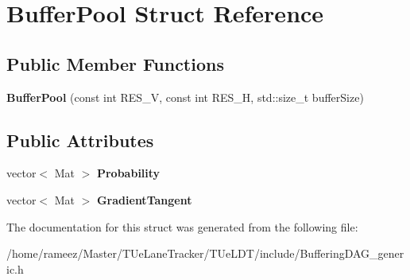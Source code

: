 \hypertarget{structBufferPool}{\section{Buffer\-Pool Struct Reference}
\label{structBufferPool}
}
\subsection*{Public Member Functions}
\begin{DoxyCompactItemize}
\item 
\hypertarget{structBufferPool_acfdbb8041159b866dc8115c3f88b0f1d}{{\bfseries Buffer\-Pool} (const int R\-E\-S\-\_\-\-V, const int R\-E\-S\-\_\-\-H, std\-::size\-\_\-t buffer\-Size)}\label{structBufferPool_acfdbb8041159b866dc8115c3f88b0f1d}

\end{DoxyCompactItemize}
\subsection*{Public Attributes}
\begin{DoxyCompactItemize}
\item 
\hypertarget{structBufferPool_a056770858422c1e4d7caea296da98050}{vector$<$ Mat $>$ {\bfseries Probability}}\label{structBufferPool_a056770858422c1e4d7caea296da98050}

\item 
\hypertarget{structBufferPool_a94171755f6ad5abd45ea909bb3dad863}{vector$<$ Mat $>$ {\bfseries Gradient\-Tangent}}\label{structBufferPool_a94171755f6ad5abd45ea909bb3dad863}

\end{DoxyCompactItemize}


The documentation for this struct was generated from the following file\-:\begin{DoxyCompactItemize}
\item 
/home/rameez/\-Master/\-T\-Ue\-Lane\-Tracker/\-T\-Ue\-L\-D\-T/include/Buffering\-D\-A\-G\-\_\-generic.\-h\end{DoxyCompactItemize}
